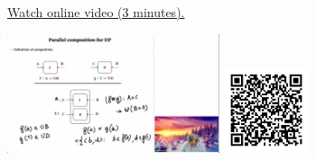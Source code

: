 
\begin{minipage}{10cm}
    \href{https://act4e-spring21.netlify.app/videos/spring2021-functorial-comp-b:solving-queries:solving-parallel.html}{Watch online video (3 minutes).}
        
    \href{https://act4e-spring21.netlify.app/videos/spring2021-functorial-comp-b:solving-queries:solving-parallel.html}{\includegraphics[height=3.5cm]{spring2021-functorial-comp-b:solving-queries:solving-parallel/thumbnails.jpg}}
    \href{https://act4e-spring21.netlify.app/videos/spring2021-functorial-comp-b:solving-queries:solving-parallel.html}{\includegraphics[height=2.5cm]{spring2021-functorial-comp-b:solving-queries:solving-parallel/qrcode.png}}
\end{minipage}
